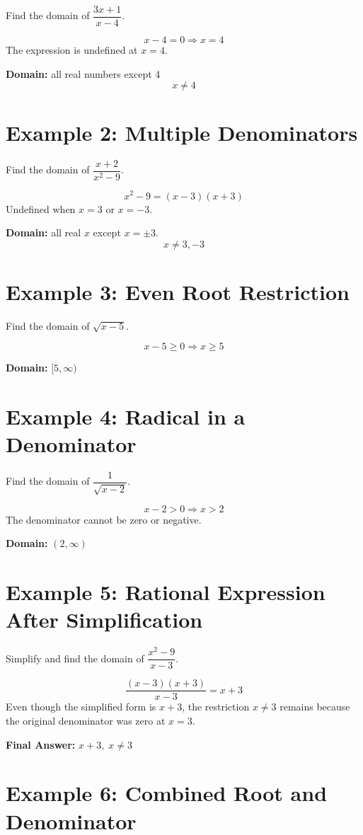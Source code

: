 \documentclass[14pt]{extarticle}
\begin{document}
Find the domain of \(\dfrac{3x + 1}{x - 4}\).

\[
x - 4 = 0 \Rightarrow x = 4
\]
The expression is undefined at \(x = 4\).

\textbf{Domain:} all real numbers except 4  
\[
\boxed{x \ne 4}
\]

\section*{Example 2: Multiple Denominators}

Find the domain of \(\dfrac{x + 2}{x^2 - 9}\).

\[
x^2 - 9 = (x - 3)(x + 3)
\]
Undefined when \(x = 3\) or \(x = -3\).

\textbf{Domain:} all real \(x\) except \(x = \pm 3\).  
\[
\boxed{x \ne 3, -3}
\]

\section*{Example 3: Even Root Restriction}

Find the domain of \(\sqrt{x - 5}\).

\[
x - 5 \ge 0 \Rightarrow x \ge 5
\]

\textbf{Domain:} \([5, \infty)\)

\section*{Example 4: Radical in a Denominator}

Find the domain of \(\dfrac{1}{\sqrt{x - 2}}\).

\[
x - 2 > 0 \Rightarrow x > 2
\]
The denominator cannot be zero or negative.

\textbf{Domain:} \((2, \infty)\)

\section*{Example 5: Rational Expression After Simplification}

Simplify and find the domain of \(\dfrac{x^2 - 9}{x - 3}\).

\[
\dfrac{(x - 3)(x + 3)}{x - 3} = x + 3
\]
Even though the simplified form is \(x + 3\), the restriction \(x \ne 3\) remains because the original denominator was zero at \(x = 3\).

\textbf{Final Answer:} \(\boxed{x + 3, \; x \ne 3}\)

\section*{Example 6: Combined Root and Denominator}
\end{document}
